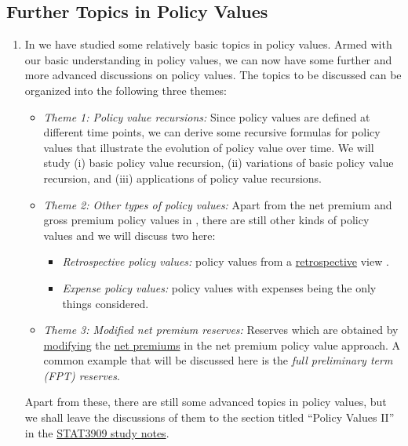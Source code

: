 \subsection{Further Topics in Policy Values}
\begin{enumerate}
\item In  we have studied some relatively
basic topics in policy values. Armed with our basic understanding in policy
values, we can now have some further and more advanced discussions on policy
values. The topics to be discussed can be organized into the following three
themes:
\begin{itemize}
\item \emph{Theme 1: Policy value recursions:} Since policy values are defined
at different time points, we can derive some recursive formulas for policy
values that illustrate the evolution of policy value over time. We will
study (i) basic policy value recursion, (ii) variations of basic policy value
recursion, and (iii) applications of policy value recursions.

\item \emph{Theme 2: Other types of policy values:} Apart from the net premium
and gross premium policy values in , there are
still other kinds of policy values and we will discuss two here:
\begin{itemize}
\item \emph{Retrospective policy values:} policy values from a
\underline{retrospective} view .
\item \emph{Expense policy values:} policy values with expenses being the only
things considered.
\end{itemize}

\item \emph{Theme 3: Modified net premium reserves:} Reserves which are
obtained by \underline{modifying} the \underline{net premiums} in the net
premium policy value approach. A common example that will be discussed here is
the \emph{full preliminary term (FPT) reserves}.
\end{itemize}
Apart from these, there are still some advanced topics in policy values, but we
shall leave the discussions of them to the section titled ``Policy Values II''
in the
\href{https://leochiukl.github.io/files/stat3909-study-notes.pdf}{STAT3909
study notes}.


\end{enumerate}
